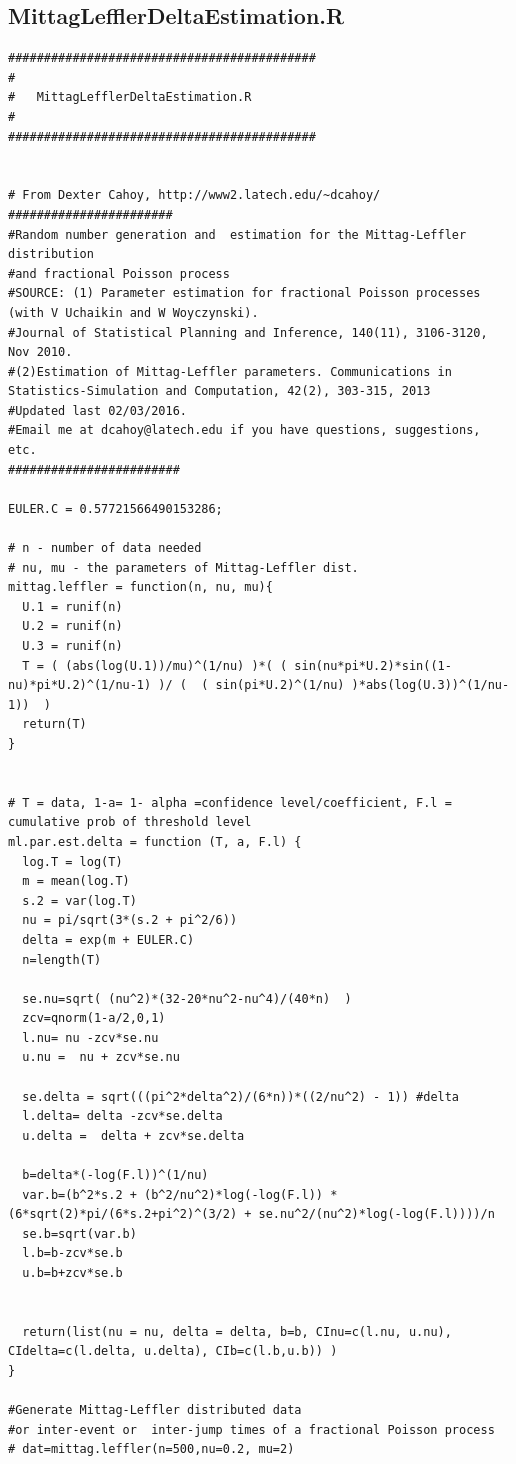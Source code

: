 \documentclass[honours,12pt]{unswthesis}
\newcommand{\1}{\mathbf 1}
\numberwithin{equation}{section}
\theoremstyle{definition}
\theoremstyle{remark}
\begin{document}
\begin{appendices}
\section{MittagLefflerDeltaEstimation.R}
\begin{lstlisting}
###########################################
#
#	MittagLefflerDeltaEstimation.R
#
###########################################


# From Dexter Cahoy, http://www2.latech.edu/~dcahoy/
#######################
#Random number generation and  estimation for the Mittag-Leffler distribution  
#and fractional Poisson process
#SOURCE: (1) Parameter estimation for fractional Poisson processes (with V Uchaikin and W Woyczynski). 
#Journal of Statistical Planning and Inference, 140(11), 3106-3120, Nov 2010.
#(2)Estimation of Mittag-Leffler parameters. Communications in Statistics-Simulation and Computation, 42(2), 303-315, 2013
#Updated last 02/03/2016.
#Email me at dcahoy@latech.edu if you have questions, suggestions, etc.
########################

EULER.C = 0.57721566490153286;

# n - number of data needed
# nu, mu - the parameters of Mittag-Leffler dist.
mittag.leffler = function(n, nu, mu){
  U.1 = runif(n)
  U.2 = runif(n)
  U.3 = runif(n)
  T = ( (abs(log(U.1))/mu)^(1/nu) )*( ( sin(nu*pi*U.2)*sin((1-nu)*pi*U.2)^(1/nu-1) )/ (  ( sin(pi*U.2)^(1/nu) )*abs(log(U.3))^(1/nu-1))  )
  return(T)
}


# T = data, 1-a= 1- alpha =confidence level/coefficient, F.l = cumulative prob of threshold level
ml.par.est.delta = function (T, a, F.l) {
  log.T = log(T)
  m = mean(log.T)
  s.2 = var(log.T)
  nu = pi/sqrt(3*(s.2 + pi^2/6))
  delta = exp(m + EULER.C)
  n=length(T)
  
  se.nu=sqrt( (nu^2)*(32-20*nu^2-nu^4)/(40*n)  )
  zcv=qnorm(1-a/2,0,1)  
  l.nu= nu -zcv*se.nu
  u.nu =  nu + zcv*se.nu
  
  se.delta = sqrt(((pi^2*delta^2)/(6*n))*((2/nu^2) - 1)) #delta
  l.delta= delta -zcv*se.delta
  u.delta =  delta + zcv*se.delta
  
  b=delta*(-log(F.l))^(1/nu)
  var.b=(b^2*s.2 + (b^2/nu^2)*log(-log(F.l)) * (6*sqrt(2)*pi/(6*s.2+pi^2)^(3/2) + se.nu^2/(nu^2)*log(-log(F.l))))/n
  se.b=sqrt(var.b)
  l.b=b-zcv*se.b
  u.b=b+zcv*se.b
  
  
  return(list(nu = nu, delta = delta, b=b, CInu=c(l.nu, u.nu), CIdelta=c(l.delta, u.delta), CIb=c(l.b,u.b)) )      
}

#Generate Mittag-Leffler distributed data 
#or inter-event or  inter-jump times of a fractional Poisson process
# dat=mittag.leffler(n=500,nu=0.2, mu=2)


\end{lstlisting}
\end{appendices}
\end{document}
